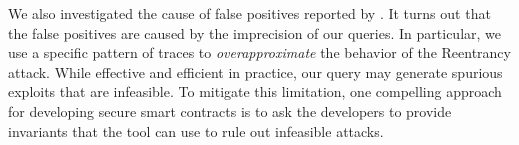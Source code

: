 We also investigated the cause of false positives 
reported by \toolname. It turns out that the false positives are 
caused by the imprecision of our queries. 
In particular, we use a specific pattern of traces to \emph{overapproximate} the 
behavior of the Reentrancy attack. While effective and 
efficient in practice, our query may generate spurious 
exploits that are infeasible. To mitigate this limitation, one 
compelling approach for developing secure smart contracts is to 
ask the developers to provide invariants that the tool can use to 
rule out infeasible attacks. 


